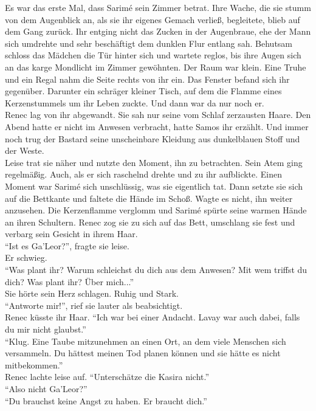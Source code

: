 Es war das erste Mal, dass Sarimé sein Zimmer betrat. Ihre Wache, die sie stumm von dem Augenblick 
an, als sie ihr eigenes Gemach verließ, begleitete, blieb auf dem Gang zurück. Ihr entging nicht 
das Zucken in der Augenbraue, ehe der Mann sich umdrehte und sehr beschäftigt dem dunklen Flur 
entlang sah. Behutsam schloss das Mädchen die Tür hinter sich und wartete reglos, bis ihre Augen 
sich an das karge Mondlicht im Zimmer gewöhnten. Der Raum war klein. Eine Truhe und ein Regal nahm 
die Seite rechts von ihr ein. Das Fenster befand sich ihr gegenüber. Darunter ein schräger kleiner 
Tisch, auf dem die Flamme eines Kerzenstummels um ihr Leben zuckte. Und dann war da nur noch er.\\
Renec lag von ihr abgewandt. Sie sah nur seine vom Schlaf zerzausten Haare. Den Abend hatte er 
nicht im Anwesen verbracht, hatte Samos ihr erzählt. Und immer noch trug der Bastard seine 
unscheinbare Kleidung aus dunkelblauen Stoff und der Weste.\\
Leise trat sie näher und nutzte den Moment, ihn zu betrachten. Sein Atem ging regelmäßig. Auch, als 
er sich raschelnd drehte und zu ihr aufblickte. Einen Moment war Sarimé sich unschlüssig, was sie 
eigentlich tat. Dann setzte sie sich auf die Bettkante und faltete die Hände im Schoß. Wagte es 
nicht, ihn weiter anzusehen. Die Kerzenflamme verglomm und Sarimé spürte seine warmen Hände an 
ihren Schultern. Renec zog sie zu sich auf das Bett, umschlang sie fest und verbarg sein Gesicht in 
ihrem Haar.\\
``Ist es Ga'Leor?'', fragte sie leise.\\
Er schwieg.\\
``Was plant ihr? Warum schleichst du dich aus dem Anwesen? Mit wem triffst du dich? Was plant 
ihr? Über mich...''\\
Sie hörte sein Herz schlagen. Ruhig und Stark.\\
``Antworte mir!'', rief sie lauter als beabsichtigt.\\
Renec küsste ihr Haar. ``Ich war bei einer Andacht. Lavay war auch dabei, falls du mir nicht 
glaubst.''\\
``Klug. Eine Taube mitzunehmen an einen Ort, an dem viele Menschen sich versammeln. Du hättest 
meinen Tod planen können und sie hätte es nicht mitbekommen.''\\
Renec lachte leise auf. ``Unterschätze die Kasira nicht.''\\
``Also nicht Ga'Leor?''\\
``Du brauchst keine Angst zu haben. Er braucht dich.''\\
